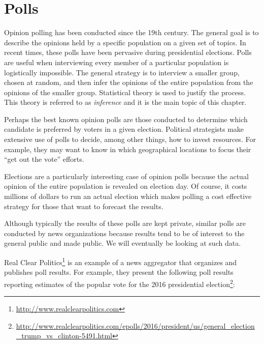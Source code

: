 \documentclass[openany]{book}
\begin{document}
\hypertarget{polls}{%
\section{Polls}\label{polls}}

Opinion polling has been conducted since the 19th century. The general goal is to describe the opinions held by a specific population on a given set of topics. In recent times, these polls have been pervasive during presidential elections. Polls are useful when interviewing every member of a particular population is logistically impossible. The general strategy is to interview a smaller group, chosen at random, and then infer the opinions of the entire population from the opinions of the smaller group. Statistical theory is used to justify the process. This theory is referred to as \emph{inference} and it is the main topic of this chapter.

Perhaps the best known opinion polls are those conducted to determine which candidate is preferred by voters in a given election. Political strategists make extensive use of polls to decide, among other things, how to invest resources. For example, they may want to know in which geographical locations to focus their ``get out the vote'' efforts.

Elections are a particularly interesting case of opinion polls because the actual opinion of the entire population is revealed on election day. Of course, it costs millions of dollars to run an actual election which makes polling a cost effective strategy for those that want to forecast the results.

Although typically the results of these polls are kept private, similar polls are conducted by news organizations because results tend to be of interest to the general public and made public. We will eventually be looking at such data.

Real Clear Politics\footnote{\url{http://www.realclearpolitics.com}} is an example of a news aggregator that organizes and publishes poll results. For example, they present the following poll results reporting estimates of the popular vote for the 2016 presidential election\footnote{\url{http://www.realclearpolitics.com/epolls/2016/president/us/general_election_trump_vs_clinton-5491.html}}:
\end{document}
